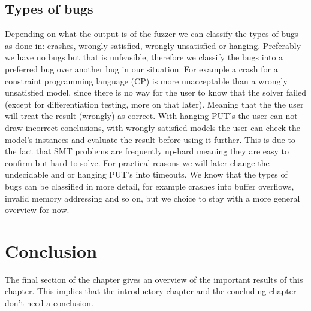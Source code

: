 
\subsection{Types of bugs} 
Depending on what the output is of the fuzzer we can classify the types of bugs as done in\cite{1mansur2020detecting}: crashes, wrongly satisfied, wrongly unsatisfied or hanging. Preferably we have no bugs but that is unfeasible, therefore we classify the bugs into a preferred bug over another bug in our situation. For example a crash for a constraint programming language (CP) is more unacceptable than a wrongly unsatisfied model, since there is no way for the user to know that the solver failed (except for differentiation testing, more on that later). Meaning that the the user will treat the result (wrongly) as correct. With hanging PUT's the user can not draw incorrect conclusions, with wrongly satisfied models the user can check the model's instances and evaluate the result before using it further. This is due to the fact that SMT problems are frequently np-hard meaning they are easy to confirm but hard to solve. For practical reasons we will later change the undecidable and or hanging PUT's into timeouts. We know that the types of bugs can be classified in more detail, for example crashes into buffer overflows, invalid memory addressing and so on, but we choice to stay with a more general overview for now.

\section{Conclusion}
The final section of the chapter gives an overview of the important results
of this chapter. This implies that the introductory chapter and the
concluding chapter don't need a conclusion.


